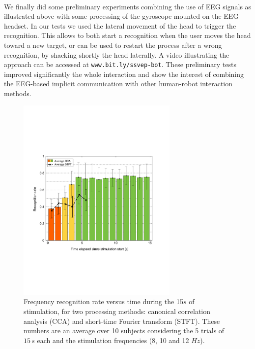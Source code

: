 \documentclass[smallextended]{svjour3}
\begin{document}
\\
We finally did some preliminary experiments combining the use of EEG signals as illustrated above with some processing of the gyroscope mounted on the EEG headset. In our tests we used the lateral movement of the head to trigger the recognition. This allows to both start a recognition when the user moves the head toward a new target, or can be used to restart the process after a wrong recognition, by shacking shortly the head laterally. A video illustrating the approach can be accessed at \verb"www.bit.ly/ssvep-bot". These preliminary tests improved significantly the whole interaction and show the interest of combining the EEG-based implicit communication with other human-robot interaction methods.

\begin{figure}
\center
\includegraphics[width=0.7\textwidth]{figures/all_time_reconn.pdf}
\caption{Frequency recognition rate versus time during the 15$s$ of stimulation, for two processing methods: canonical correlation analysis (CCA) and short-time Fourier transform (STFT). These numbers are an average over 10 subjects considering the 5 trials of $15\,s$ each and the stimulation frequencies (8, 10 and 12 $Hz$).} \label{fig:all_time_reconn}
\end{figure}
\end{document}
